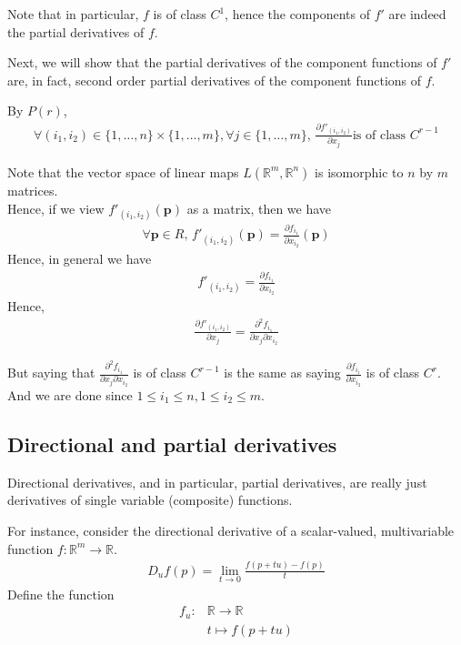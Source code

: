 \documentclass{article}
\begin{document}
Note that in particular, $f$ is of class $C^1$, hence the components of $f'$ are indeed the partial derivatives of $f$.

Next, we will show that the partial derivatives of the component functions of $f'$ are, in fact, second order partial derivatives of the component functions of $f$.

By $P(r)$,  
\begin{align*}
	\forall (i_1,i_2)\in \{1,\dots, n\}\times \{1,\dots, m\}, \forall j\in \{1,\dots, m\}, \, \frac{\partial f'_{(i_1, i_2)}}{\partial x_j} \text{is of class } C^{r-1}
\end{align*}

Note that the vector space of linear maps $L(\mathbb{R}^m, \mathbb{R}^n)$ is isomorphic to $n$ by $m$ matrices.\\
Hence, if we view $f'_{(i_1, i_2)}(\mathbf{p})$ as a matrix, then we have
\begin{align*}
	\forall \mathbf{p}\in R, \, f'_{(i_1, i_2)}(\mathbf{p}) = \frac{\partial f_{i_1}}{\partial x_{i_2}}(\mathbf{p})
\end{align*}
Hence, in general we have
\begin{align*}
	f'_{(i_1, i_2)} = \frac{\partial f_{i_1}}{\partial x_{i_2}}
\end{align*}
Hence, 
\begin{align*}
	\frac{\partial f'_{(i_1, i_2)}}{\partial x_j} = \frac{\partial^2 f_{i_1}}{\partial x_j \partial x_{i_2}}
\end{align*}

But saying that $\frac{\partial^2 f_{i_1}}{\partial x_j \partial x_{i_2}}$ is of class $C^{r-1}$ is the same as saying $\frac{\partial f_{i_1}}{\partial x_{i_2}}$ is of class $C^r$. And we are done since $1\leq i_1\leq n, 1\leq i_2\leq m$.

\subsection{Directional and partial derivatives}
Directional derivatives, and in particular, partial derivatives, are really just derivatives of single variable (composite) functions.

For instance, consider the directional derivative of a scalar-valued, multivariable function $f: \mathbb{R}^m \rightarrow \mathbb{R}$.
\begin{align*}
	D_uf(p)=\lim_{t\rightarrow 0}\frac{f(p+tu)-f(p)}{t}
\end{align*} 
Define the function
\begin{align*}
	f_u: &\mathbb{R}\rightarrow \mathbb{R}\\
	&t \mapsto f(p+tu)
\end{align*}
\end{document}
